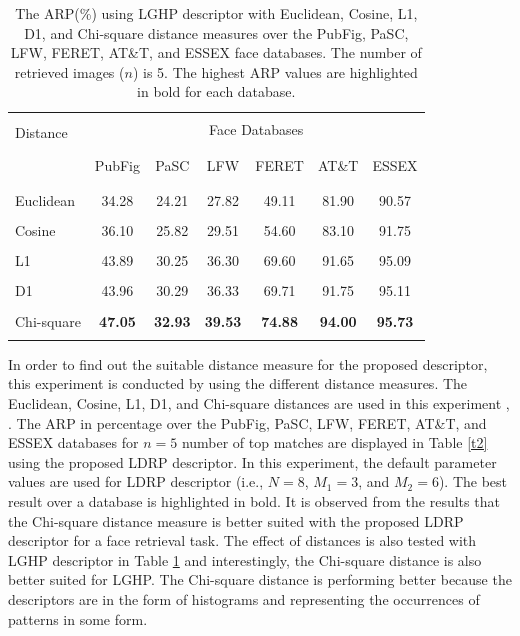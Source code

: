 \documentclass[a4paper]{article}
\begin{document}
\begin{table}[!t]
\caption{The ARP(\%) using LGHP descriptor \cite{lghp} with Euclidean, Cosine, L1, D1, and Chi-square distance measures over the PubFig, PaSC, LFW, FERET, AT\&T, and ESSEX face databases. The number of retrieved images ($n$) is 5. The highest ARP values are highlighted in bold for each database.}
\label{t3}
\begin{center}
\begin{tabular}{lcccccc}
\hline
\\[-0.65em]\multirow{2}{*}{Distance} & \multicolumn{6}{c}{Face Databases}\\ \\[-0.65em]
\cline{2-7} 
\\[-0.65em] & PubFig & PaSC & LFW & FERET & AT\&T & ESSEX \\ \\[-0.65em]
\hline
\\[-0.65em]
Euclidean & 34.28 & 24.21 & 27.82 & 49.11 & 81.90 & 90.57\\ \\[-0.85em]
Cosine & 36.10 & 25.82 & 29.51 & 54.60 & 83.10 & 91.75\\ \\[-0.85em]
L1 & 43.89 & 30.25 & 36.30 & 69.60 & 91.65 & 95.09\\ \\[-0.85em]
D1 & 43.96 & 30.29 & 36.33 & 69.71 & 91.75 & 95.11\\ \\[-0.85em]
Chi-square & \textbf{47.05} & \textbf{32.93} & \textbf{39.53} & \textbf{74.88} & \textbf{94.00} & \textbf{95.73}\\ \\[-0.65em]
\hline
\end{tabular}
\end{center}
\end{table}

In order to find out the suitable distance measure for the proposed descriptor, this experiment is conducted by using the different distance measures. The Euclidean, Cosine, L1, D1, and Chi-square distances are used in this experiment \cite{ltrp}, \cite{mdlbp}. The ARP in percentage over the PubFig, PaSC, LFW, FERET, AT\&T, and ESSEX databases for $n=5$ number of top matches are displayed in Table \ref{t2} using the proposed LDRP descriptor. In this experiment, the default parameter values are used for LDRP descriptor (i.e., $N=8$, $M_1=3$, and $M_2=6$). The best result over a database is highlighted in bold. It is observed from the results that the Chi-square distance measure is better suited with the proposed LDRP descriptor for a face retrieval task. The effect of distances is also tested with LGHP descriptor \cite{lghp} in Table \ref{t3} and interestingly, the Chi-square distance is also better suited for LGHP. The Chi-square distance is performing better because the descriptors are in the form of histograms and representing the occurrences of patterns in some form.
\end{document}
